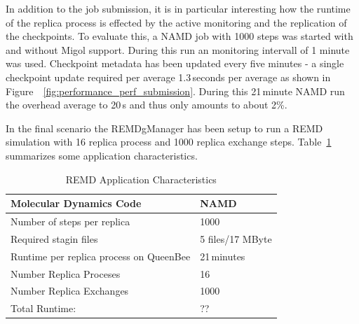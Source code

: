 \documentclass[times, 10pt,twocolumn]{article}
\begin{document}
In addition to the job submission, it is in particular interesting how the runtime of the 
replica process is effected by the active monitoring and the replication of the checkpoints. 
To evaluate this, a NAMD job with 1000 steps was started with and without Migol support. 
During this run an monitoring intervall of 1 minute was used. Checkpoint metadata has been 
updated every five minutes - a single checkpoint update required per average  1.3\,seconds 
per average as shown in Figure~~\ref{fig:performance_perf_submission}.  During this 21\,minute 
NAMD run the overhead average to 20\,s and thus only amounts to about 2\%. 
                                                                                   

In the final scenario the REMDgManager has been setup to run a REMD simulation with 16 replica process 
and 1000 replica exchange steps. Table~\ref{tab:app_stats} summarizes some application characteristics.

\begin{table}        
    \centering
	\begin{tabular}{|p{5cm}|l|}
	\hline
    Molecular Dynamics Code &NAMD\\ \hline
    Number of steps per replica &1000\\ \hline 
    Required stagin files &5 files/17 MByte\\ \hline
	Runtime per replica process on QueenBee &21\,minutes\\ \hline   
	Number Replica Proceses &16 \\ \hline
	Number Replica Exchanges &1000\\ \hline
	Total Runtime: &??   \\ \hline
	\end{tabular}
	\caption{REMD Application Characteristics\label{tab:app_stats}}
\end{table}
\end{document}
